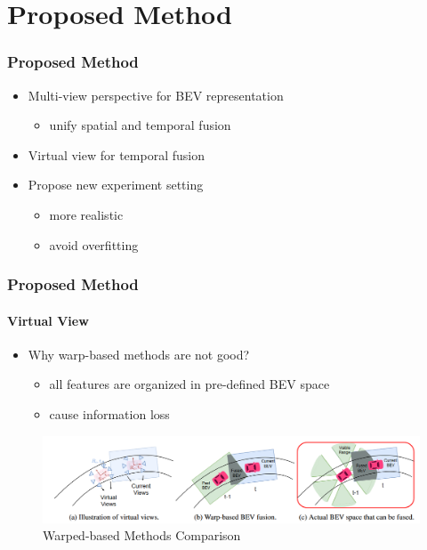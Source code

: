 \documentclass[
	12pt, %
	aspectratio=169, %
]{beamer}
\begin{document}

\section{Proposed Method}

\begin{frame}
	\frametitle{Proposed Method}

	\begin{itemize}
		\item Multi-view perspective for BEV representation
		\begin{itemize}
			\item unify spatial and temporal fusion
		\end{itemize}
		\item Virtual view for temporal fusion
		\item Propose new experiment setting
		\begin{itemize}
			\item more realistic
			\item avoid overfitting
		\end{itemize}
	\end{itemize}

\end{frame}

\begin{frame}
	\frametitle{Proposed Method}
	\framesubtitle{Virtual View}

	\begin{itemize}
		\item Why warp-based methods are not good?
		\begin{itemize}
			\item all features are organized in pre-defined BEV space
			\item cause information loss
		\end{itemize}
	\end{itemize}

	\begin{figure}
		\centering
		\includegraphics[width=0.95\linewidth]{"./Images/warp_based_method.png"}
		\caption{Warped-based Methods Comparison}
	\end{figure}
\end{frame}
\end{document}
